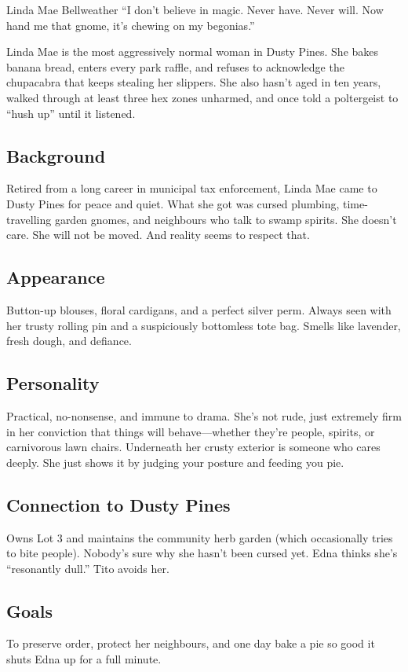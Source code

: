\newpage
\begin{WyrdCharacterSheet}
    {Linda Mae Bellweather}
    {“I don’t believe in magic. Never have. Never will. Now hand me that gnome, it’s chewing on my begonias.”}
    \label{pc:linda-mae}

    Linda Mae is the most aggressively normal woman in Dusty Pines. She bakes banana bread, enters every park raffle, and refuses to acknowledge the chupacabra that keeps stealing her slippers. She also hasn’t aged in ten years, walked through at least three hex zones unharmed, and once told a poltergeist to “hush up” until it listened.

    \subsection{Background}
    Retired from a long career in municipal tax enforcement, Linda Mae came to Dusty Pines for peace and quiet. What she got was cursed plumbing, time-travelling garden gnomes, and neighbours who talk to swamp spirits. She doesn’t care. She will not be moved. And reality seems to respect that.

    \subsection{Appearance}
    Button-up blouses, floral cardigans, and a perfect silver perm. Always seen with her trusty rolling pin and a suspiciously bottomless tote bag. Smells like lavender, fresh dough, and defiance.

    \subsection{Personality}
    Practical, no-nonsense, and immune to drama. She’s not rude, just extremely firm in her conviction that things will behave—whether they’re people, spirits, or carnivorous lawn chairs. Underneath her crusty exterior is someone who cares deeply. She just shows it by judging your posture and feeding you pie.

    \subsection{Connection to Dusty Pines}
    Owns Lot 3 and maintains the community herb garden (which occasionally tries to bite people). Nobody’s sure why she hasn’t been cursed yet. Edna thinks she’s “resonantly dull.” Tito avoids her.

    \subsection{Goals}
    To preserve order, protect her neighbours, and one day bake a pie so good it shuts Edna up for a full minute.


\end{WyrdCharacterSheet}
